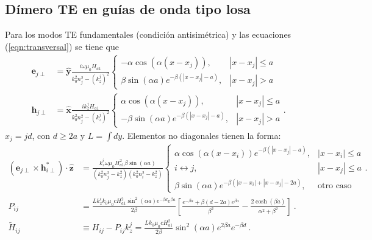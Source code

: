 \subsection{Dímero TE en guías de onda tipo losa}
Para los modos TE fundamentales (condición antisimétrica) y las ecuaciones (\ref{eqn:transversal}) se tiene que
\begin{align*}
	\textbf{e}_{j\perp} &= \hat{\textbf{y}}\frac{i\omega\mu_0 H_{a1}}{k_0^2n_j^2 - (k_z^j)^2}\left\{ \begin{matrix}
-\alpha \cos(\alpha (x-x_j)), &|x-x_j|\le a
\\
\beta\sin(\alpha a) e^{-\beta(|x-x_j|-a)}, &|x-x_j| > a
\end{matrix}\right.
\\
\textbf{h}_{j\perp} &= \hat{\textbf{x}}\frac{ik_z^j H_{a1}}{k_0^2n_j^2 - (k_z^j)^2}\left\{ \begin{matrix}
\alpha \cos(\alpha (x-x_j)), &|x-x_j|\le a
\\
-\beta\sin(\alpha a) e^{-\beta(|x-x_j|-a)}, &|x-x_j| > a
\end{matrix}\right. .
\end{align*}
$x_j=jd$, con $d\ge 2a$ y $L=\int dy$. Elementos no diagonales tienen la forma:
\begin{align*}
	\left(\textbf{e}_{j\perp}\times\textbf{h}_{i\perp}^*\right)\cdot \hat{\textbf{z}}
	&=
	\frac{k_z^i \omega \mu_0 H_{a1}^2 \beta\sin(\alpha a)}{(k_0^2n_j^2 - k_z^2)(k_0^2n_i^2 - k_z^2)}
	\left\{
	\begin{matrix}
		 \alpha\cos(\alpha(x-x_i))e^{-\beta(|x-x_j|-a)}, & |x-x_i| \le a
		\\
		i \leftrightarrow j, & |x-x_j| \le a
		\\
		\beta \sin(\alpha a)e^{-\beta (|x-x_i|+|x-x_j|-2a)}, & \text{otro caso}
	\end{matrix}
	\right. .
\\
	P_{ij} &= \frac{L k_z^i k_0  \mu_0 c H_{a1}^2 \sin^2(\alpha a)e^{-\beta d}e^{\beta a}}{2\beta} \left[\frac{e^{-\beta a} + \beta (d-2a)e^{\beta a}}{\beta^2} - \frac{2\cosh(\beta a)}{\alpha^2+\beta^2} \right] \ .
\\
	\tilde{H}_{ij} &\equiv H_{ij} - P_{ij} k_z^j = \frac{L k_0    \mu_0 c H_{a1}^2 }{2 \beta }  \sin^2(\alpha a)e^{2\beta a} e^{-\beta d} \ .
\end{align*}

